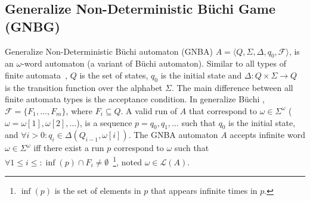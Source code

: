 \documentclass[ twoside, 12pt ]{article}
\newcommand{\commentOut}[1]{}
\newcommand{\buchi}{B\"uchi }
\begin{document}
\commentOut{

}


\subsection{Generalize Non-Deterministic \buchi Game (GNBG)}
\label{sec:GNBG}

Generalize Non-Deterministic \buchi automaton (GNBA) $A= \langle Q,\Sigma,\Delta,q_0,\mathcal{F} \rangle $, is an $\omega$-word automaton (a variant of \buchi automaton).
Similar to all types of finite automata~\cite{???}, $Q$ is the set of states, $q_0$ is the initial state and $\Delta : Q \times \Sigma \xrightarrow{} Q$ is the transition function over the alphabet $\Sigma$.
The main difference between all finite automata types is the acceptance condition.
In generalize \buchi, $\mathcal{F} = \{ F_1 , \dots , F_m \}$, where $F_i \subseteq Q$.
A valid run of $A$ that correspond to $\omega \in \Sigma^\omega$ ($\omega = \omega[1], \omega[2], \dots$), is a sequence $p=q_0,q_1, \dots$ such that $q_0$ is the initial state, and $\forall i>0 : q_i \in \Delta(Q_{i-1}, \omega[i])$.
The GNBA automaton $A$ accepts infinite word $\omega \in \Sigma^\omega$ iff there exist a run $p$ correspond to $\omega$ such that $\forall 1 \le i \le : \inf(p) \cap F_i \neq \emptyset$~\footnote{$\inf(p)$ is the set of elements in $p$ that appears infinite times in $p$.}, noted $\omega \in \mathcal{L}(A)$.
\end{document}
